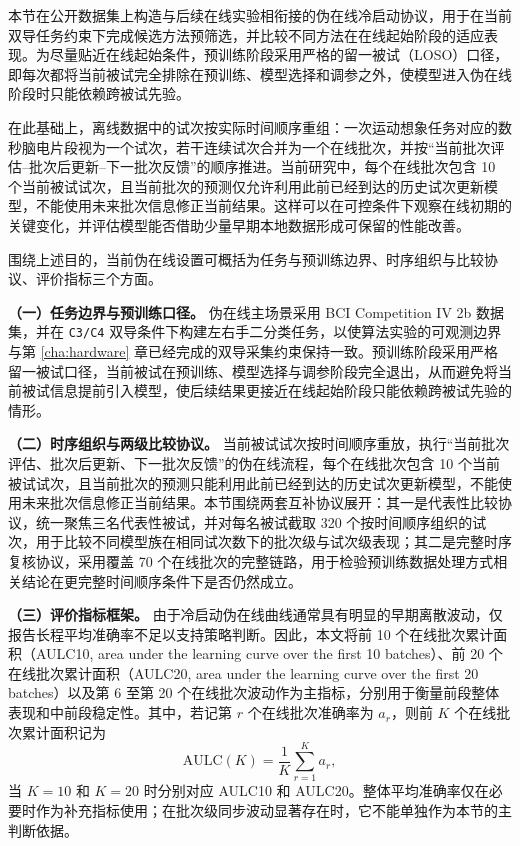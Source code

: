 本节在公开数据集上构造与后续在线实验相衔接的伪在线冷启动协议，用于在当前双导任务约束下完成候选方法预筛选，并比较不同方法在在线起始阶段的适应表现。为尽量贴近在线起始条件，预训练阶段采用严格的留一被试（LOSO）口径，即每次都将当前被试完全排除在预训练、模型选择和调参之外，使模型进入伪在线阶段时只能依赖跨被试先验。

在此基础上，离线数据中的试次按实际时间顺序重组：一次运动想象任务对应的数秒脑电片段视为一个试次，若干连续试次合并为一个在线批次，并按“当前批次评估--批次后更新--下一批次反馈”的顺序推进。当前研究中，每个在线批次包含 10 个当前被试试次，且当前批次的预测仅允许利用此前已经到达的历史试次更新模型，不能使用未来批次信息修正当前结果。这样可以在可控条件下观察在线初期的关键变化，并评估模型能否借助少量早期本地数据形成可保留的性能改善。

围绕上述目的，当前伪在线设置可概括为任务与预训练边界、时序组织与比较协议、评价指标三个方面。

\noindent\textbf{（一）任务边界与预训练口径。}
伪在线主场景采用 BCI Competition IV 2b 数据集，并在 \texttt{C3/C4} 双导条件下构建左右手二分类任务，以使算法实验的可观测边界与第 \ref{cha:hardware} 章已经完成的双导采集约束保持一致。预训练阶段采用严格留一被试口径，当前被试在预训练、模型选择与调参阶段完全退出，从而避免将当前被试信息提前引入模型，使后续结果更接近在线起始阶段只能依赖跨被试先验的情形。

\noindent\textbf{（二）时序组织与两级比较协议。}
当前被试试次按时间顺序重放，执行“当前批次评估、批次后更新、下一批次反馈”的伪在线流程，每个在线批次包含 10 个当前被试试次，且当前批次的预测只能利用此前已经到达的历史试次更新模型，不能使用未来批次信息修正当前结果。本节围绕两套互补协议展开：其一是代表性比较协议，统一聚焦三名代表性被试，并对每名被试截取 320 个按时间顺序组织的试次，用于比较不同模型族在相同试次数下的批次级与试次级表现；其二是完整时序复核协议，采用覆盖 70 个在线批次的完整链路，用于检验预训练数据处理方式相关结论在更完整时间顺序条件下是否仍然成立。

\noindent\textbf{（三）评价指标框架。}
由于冷启动伪在线曲线通常具有明显的早期离散波动，仅报告长程平均准确率不足以支持策略判断。因此，本文将前 10 个在线批次累计面积（AULC10, area under the learning curve over the first 10 batches）、前 20 个在线批次累计面积（AULC20, area under the learning curve over the first 20 batches）以及第 6 至第 20 个在线批次波动作为主指标，分别用于衡量前段整体表现和中前段稳定性。其中，若记第 $r$ 个在线批次准确率为 $a_r$，则前 $K$ 个在线批次累计面积记为
\begin{equation}
\mathrm{AULC}(K)=\frac{1}{K}\sum_{r=1}^{K} a_r,
\end{equation}
当 $K=10$ 和 $K=20$ 时分别对应 AULC10 和 AULC20。整体平均准确率仅在必要时作为补充指标使用；在批次级同步波动显著存在时，它不能单独作为本节的主判断依据。


